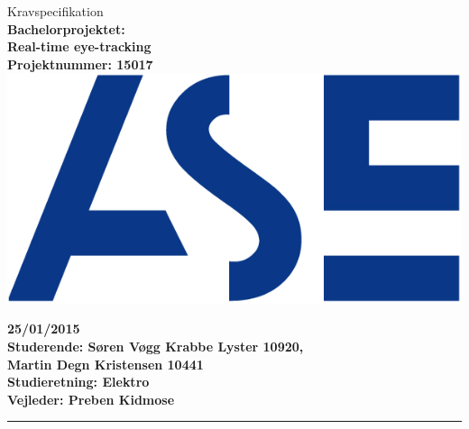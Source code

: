 \documentclass[a4paper,oneside,12pt]{article}
\begin{document}
\begin{titlepage}
\centering
\vfill
{\LARGE Kravspecifikation}\\
\vfill
{\bfseries\large
	Bachelorprojektet: \\
	Real-time eye-tracking\\
	Projektnummer: 15017\\
}
\vfill
\includegraphics{ASE_logo.png}
\vfill
{\bfseries\large
	25/01/2015\\
	Studerende: Søren Vøgg Krabbe Lyster 10920,\\
	Martin Degn Kristensen 10441\\
	Studieretning: Elektro \\
	Vejleder: Preben Kidmose \\
	\vfill	
	\rule{6cm}{1pt}
}
\vfill

\end{titlepage}

\tableofcontents





\end{document}
